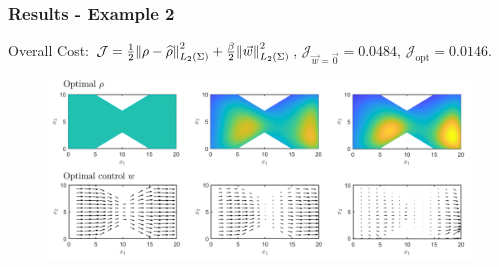 \documentclass[aspectratio=169,xcolor=dvipsnames]{beamer}
\begin{document}
\begin{frame}
	\frametitle{Results - Example 2}
	\vspace{0.3cm}
	Overall Cost: $\mathcal J = \frac{1}{2}\norm{\rho- \widehat{\rho}}_{L_2(\Sigma)}^2 + \frac{\beta}{2} \norm{\vec{w}}_{L_2(\Sigma)}^2$, $\mathcal J_{\vec{w} = \vec 0} = 0.0484$, $\mathcal J_{\text{opt}} = 0.0146$.
	\begin{figure}
		\includegraphics[width=14cm]{ExRes2b3.png}
	\end{figure}
\end{frame}
\end{document}
